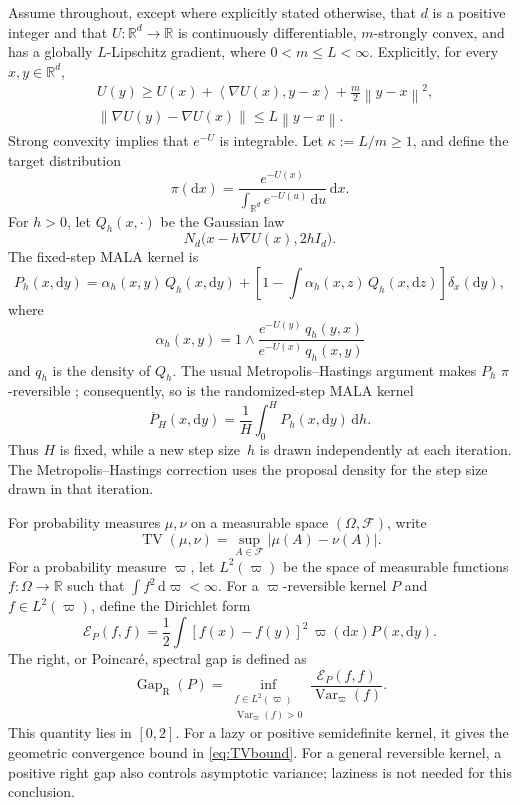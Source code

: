 \documentclass[11pt]{article}
\newcommand{\R}{\mathbb R}
\newcommand{\Var}{\operatorname{Var}}
\newcommand{\Gap}{\operatorname{Gap}_{\mathrm{R}}}
\newcommand{\TV}{\operatorname{TV}}
\newcommand{\cE}{\mathcal E}
\newcommand{\ip}[2]{\left\langle #1,#2\right\rangle}
\newcommand{\norm}[1]{\left\lVert #1\right\rVert}
\newcommand{\abs}[1]{\left\lvert #1\right\rvert}
\newcommand{\1}{\mathbf 1}
\newcommand{\df}{\mathrm{d}}
\begin{document}
	Assume throughout, except where explicitly stated otherwise, that \(d\) is a
	positive integer and that \(U:\R^d\to\R\) is continuously differentiable,
	\(m\)-strongly convex, and has a globally \(L\)-Lipschitz gradient, where
	\(0<m\leq L<\infty\). Explicitly, for every \(x,y\in\R^d\),
	\begin{equation}\label{eq:first-order-assumptions}
		\begin{aligned}
			&U(y)\geq U(x)+\ip{\nabla U(x)}{y-x}+\frac m2\norm{y-x}^2,\\
			&\norm{\nabla U(y)-\nabla U(x)}\leq L\norm{y-x}.
		\end{aligned}
	\end{equation}
	Strong convexity implies that \(e^{-U}\) is integrable.
	Let \(\kappa:=L/m\geq1\), and define the target distribution
	\[
	\pi(\df x)=\frac{e^{-U(x)}}{\int_{\R^d}e^{-U(u)}\,\df u}\,\df x.
	\]
	For \(h>0\), let \(Q_h(x,\cdot)\) be the Gaussian law
	\[
	N_d \bigl(x-h\nabla U(x),2hI_d\bigr).
	\]
	The fixed-step MALA kernel is
	\[
	P_h(x,\df y)=\alpha_h(x,y) \, Q_h(x,\df y)
	+\left[1-\int\alpha_h(x,z) \, Q_h(x,\df z)\right]\delta_x(\df y),
	\]
	where
	\[
	\alpha_h(x,y)
	=1\wedge
	\frac{e^{-U(y)} \, q_h(y,x)}{e^{-U(x)} \, q_h(x,y)}
	\]
	and \(q_h\) is the density of \(Q_h\).  The usual
	Metropolis--Hastings argument makes \(P_h\) \(\pi\)-reversible
	\citep{Tierney1998}; consequently, so is the randomized-step MALA kernel
	\[
	\overline P_H(x,\df y)=\frac{1}{H}\int_0^H P_h(x, \df y)\,\df h.
	\]
	Thus $H$ is fixed, while a new step size~$h$ is drawn independently at each
	iteration. The Metropolis--Hastings correction uses the proposal density
	for the step size drawn in that iteration.
	
	For probability measures \(\mu,\nu\) on a measurable space $(\Omega,\mathcal{F})$, write
	\[
	\TV(\mu,\nu)=\sup_{A \in \mathcal{F}}\abs{\mu(A)-\nu(A)}.
	\]
	For a probability measure $\varpi$, let $L^2(\varpi)$ be the space of
	measurable functions $f:\Omega\to\R$ such that
	$\int f^2\,\df\varpi<\infty$.  For a $\varpi$-reversible kernel $P$ and
	$f\in L^2(\varpi)$, define the Dirichlet form
	\[
	\cE_P(f,f)
	=\frac12\int[f(x)-f(y)]^2\,\varpi(\df x)P(x,\df y).\]
	The right, or Poincar\'e, spectral gap is defined as  
	\begin{equation} \label{eq:gap}
		\Gap(P)=\inf_{\substack{f\in L^2(\varpi)\\ \Var_\varpi(f)>0}}
		\frac{\cE_P(f,f)}{\Var_\varpi(f)}.
	\end{equation}
	This quantity lies in $[0,2]$. For a lazy or positive semidefinite kernel,
	it gives the geometric convergence bound in \eqref{eq:TVbound}.
	For a general reversible kernel, a positive right gap also controls
	asymptotic variance; laziness is not needed for this conclusion.
	
\end{document}
